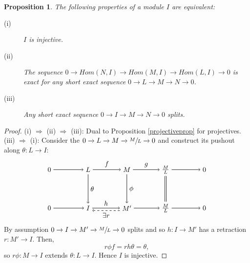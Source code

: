 \documentclass[11.5pt, twoside, a4paper, titlepage]{report}
\theoremstyle{definition}
\theoremstyle{plain}
\newtheorem{prop}[mydef]{Proposition}
\begin{document}
\begin{prop} \label{injectiveprop}
The following properties of a module $I$ are equivalent:
\begin{description}
\item [(i)] $I$ is injective.
\item [(ii)] The sequence $0\xrightarrow{} Hom(N, I) \xrightarrow{} Hom(M, I) \xrightarrow{} Hom(L, I) \xrightarrow{} 0$ is exact for any short exact sequence $0\xrightarrow{} L \xrightarrow{} M\xrightarrow{} N \xrightarrow {} 0$.
\item [(iii)] Any short exact sequence $0 \xrightarrow{} I \xrightarrow{} M \xrightarrow{} N \xrightarrow{}0$ splits.
\end{description}
\end{prop}
\begin{proof}
(i) $\Rightarrow$ (ii) $\Rightarrow$ (iii): Dual to Proposition \ref{projectiveprop}  for projectives.
(iii) $\Rightarrow$ (i): Consider the $0\xrightarrow{}L\xrightarrow{}M\xrightarrow{}\sfrac{M}{L} \xrightarrow{} 0$ and construct its pushout along $\theta: L \to I$:
\begin{equation*}
\begin{tikzpicture}[->,-latex, auto, main path/.style={->, semithick}, main node/.style={}]

\node	[main node]		(2) at (2,0)		{$0$};
\node	[main node]		(3) at (4,0)		{$L$};
\node [main node]		(4) at (6,0)		{$M$};
\node [main node]		(5) at (8,0)		{$\frac{M}{L}$};
\node	[main node]		(11) at (10,0)	{$0$};

\node	[main node]		(7) at (2,-2)		{$0$};
\node	[main node]		(8) at (4,-2)		{$I$};
\node [main node]		(9) at (6,-2)		{$M'$};
\node [main node]		(10) at (8,-2)	{$\frac{M}{L}$};
\node [main node]		(13) at (10,-2)	{$0$};

\draw (2) edge [main path] node [auto] {$$} (3);
\draw (3) edge [main path] node [auto] {$f$} (4);
\draw (4) edge [main path] node [auto] {$g$} (5);
\draw (5) edge [main path] (11);

\draw (7) edge [main path] node [auto] {$$} (8);
\path (8.0) edge [main path] node [auto] {$h$} (9.180);
\path (9.200) edge [dashed, ->, semithick] node [auto] {$\exists r$} (8.330);
\draw (9) edge [main path] node [auto, swap] {$$} (10);
\draw (10) edge [main path] (13);

\draw (3) edge [main path] node [auto] {$\theta$} (8);
\draw (4) edge [main path] node [auto] {$\phi$} (9);
\draw (5) edge [-, semithick, double, double distance=1.5pt](10);
\end{tikzpicture}
\end{equation*}
By assumption $0\xrightarrow{}I\xrightarrow{}M'\xrightarrow{}\sfrac{M}{L}\xrightarrow{}0$ splits and so $h:I \to M'$ has a retraction $r:M'\to I$. Then,
\begin{equation*}
r\phi f=rh\theta=\theta,
\end{equation*}
so $r\phi : M \to I$ extends $\theta: L \to I$. Hence $I$ is injective.
\end{proof}
\end{document}
